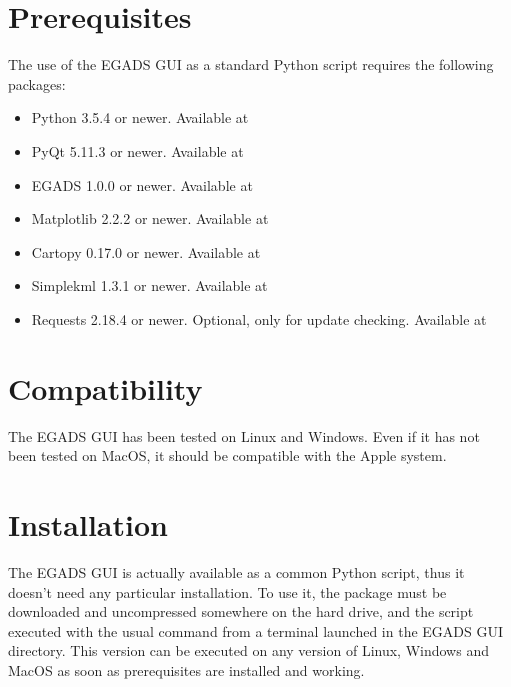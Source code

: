 \documentclass[a4paper,10pt,openany,english]{sphinxmanual}
\begin{document}
\section{Prerequisites}
\label{\detokenize{install:prerequisites}}
The use of the EGADS GUI as a standard Python script requires the following packages:
\begin{itemize}
\item {} 
Python 3.5.4 or newer. Available at 

\item {} 
PyQt 5.11.3 or newer. Available at 

\item {} 
EGADS 1.0.0 or newer. Available at 

\item {} 
Matplotlib 2.2.2 or newer. Available at 

\item {} 
Cartopy 0.17.0 or newer. Available at 

\item {} 
Simplekml 1.3.1 or newer. Available at 

\item {} 
Requests 2.18.4 or newer. Optional, only for update checking. Available at 

\end{itemize}


\section{Compatibility}
\label{\detokenize{install:compatibility}}
The EGADS GUI has been tested on Linux and Windows. Even if it has not been tested on MacOS, it should be compatible with the Apple system.


\section{Installation}
\label{\detokenize{install:id1}}
The EGADS GUI is actually available as a common Python script, thus it doesn’t need any particular installation. To use it, the package must be downloaded and uncompressed somewhere on the hard drive, and the script executed with the usual command  from a terminal launched in the EGADS GUI directory. This version can be executed on any version of Linux, Windows and MacOS as soon as prerequisites are installed and working.
\end{document}
